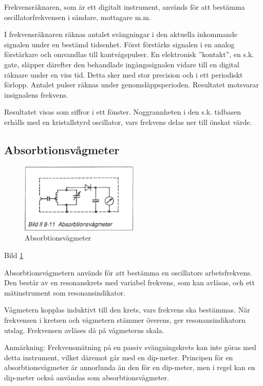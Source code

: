 Frekvensräknaren, som är ett digitalt instrument, används för att
bestämma oscillatorfrekvensen i sändare, mottagare m.m.

I frekvensräknaren räknas antalet svängningar i den aktuella
inkommande signalen under en bestämd tidsenhet. Först förstärks
signalen i en analog förstärkare och omvandlas till kantvågspulser. En
elektronisk ''kontakt'', en s.k. gate, släpper därefter den behandlade
ingångssignalen vidare till en digital räknare under en viss
tid. Detta sker med stor precision och i ett periodiskt
förlopp. Antalet pulser räknas under genomsläppsperioden. Resultatet
motsvarar insignalens frekvens.

Resultatet visas som siffror i ett fönster. Noggrannheten i den
s.k. tidbasen erhålls med en kristallstyrd oscillator, vars frekvens
delas ner till önskat värde.

\begin{rev-raderas}
\subsection{Absorbtionsvågmeter}

\begin{figure}
  \includegraphics[width=0.5\textwidth]{images/bild_2_8-11}
  \caption{Absorbtionsvågmeter}
  \label{fig:bildII8-11}
\end{figure}

Bild \ref{fig:bildII8-11}

Absorbtionsvågmetern används för att bestämma en oscillators
arbetsfrekvens. Den består av en resonanskrets med variabel frekvens,
som kan avläsas, och ett mätinstrument som resonansindikator.

Vågmetern kopplas induktivt till den krets, vars frekvens ska
bestämmas. När frekvensen i kretsen och vågmetern stämmer överens, ger
resonansindikatorn utslag. Frekvensen avläses då på vågmeterns skala.

Anmärkning: Frekvensmätning på en passiv svängningskrets kan inte
göras med detta instrument, vilket däremot går med en
dip-meter. Principen för en absorbtionsvågmeter är annorlunda än den
för en dip-meter, men i regel kan en dip-meter också användas som
absorbtionsvågmeter.
\end{rev-raderas}

